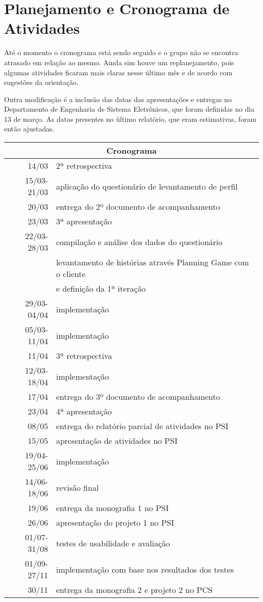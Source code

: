 \documentclass[a4paper,12pt,font=plain,header=plain]{abnt}
\begin{document}
  \section{Planejamento e Cronograma de Atividades}

    Até o momento o cronograma está sendo seguido e o grupo não se encontra atrasado em relação ao mesmo. Ainda sim houve um replanejamento, pois algumas atividades ficaram mais claras nesse último mês e de acordo com sugestões da orientação.

    Outra modificação é a inclusão das datas das apresentações e entregas no Departamento de Engenharia de Sistema Eletrônicos, que foram definidas no dia 13 de março. As datas presentes no último relatório, que eram estimativas, foram então ajustadas.

		\begin{tabular}[|l|]{ |r|l| }
		\hline
			\multicolumn{2}{|c|}{\large{Cronograma}} \\
		\hline
			14/03 & 2ª retrospectiva \\
		\hline
			15/03-21/03 & aplicação do questionário de levantamento de perfil \\
		\hline
			20/03 & entrega do 2º documento de acompanhamento \\
		\hline
			23/03 & 3ª apresentação \\
		\hline
			22/03-28/03 & compilação e análise dos dados do questionário \\
			 & levantamento de histórias através Planning Game com o cliente \\
			 & e definição da 1ª iteração \\
		\hline
			29/03-04/04 & implementação \\
		\hline
			05/03-11/04 & implementação \\
		\hline
			11/04 & 3ª retrospectiva \\
		\hline
			12/03-18/04 & implementação \\
		\hline
			17/04 & entrega do 3º documento de acompanhamento \\
		\hline
			23/04 & 4ª apresentação \\
    \hline
      08/05 & entrega do relatório parcial de atividades no PSI \\
    \hline
      15/05 & apresentação de atividades no PSI \\
		\hline
			19/04-25/06 & implementação \\
		\hline
			14/06-18/06 & revisão final \\
		\hline
			19/06 & entrega da monografia 1 no PSI \\
		\hline
			26/06 & apresentação do projeto 1 no PSI \\
		\hline
			01/07-31/08 & testes de usabilidade e avaliação \\
		\hline
			01/09-27/11 & implementação com base nos resultados dos testes \\
		\hline
			30/11 & entrega da monografia 2 e projeto 2 no PCS \\
		\hline
		\end{tabular} \\
\end{document}
